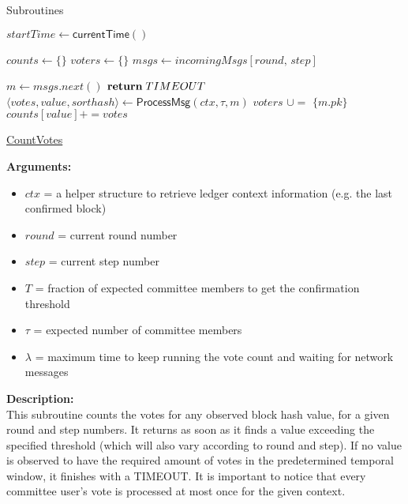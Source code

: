 \documentclass[10pt,a4paper]{article}
\begin{document}
\begin{section}{Subroutines}\label{sect:soubroutines}

\begin{algorithm}[H]
    \begin{algorithmic}[H]

    \State $startTime \gets \mathsf{currentTime}()$

    \State $counts \gets \{\}$ 
    \State $voters \gets \{\}$
    \State $msgs \gets incomingMsgs[round,\,step]$

        \State $m \gets msgs.next()$
                \State $\Return\;TIMEOUT$
            \EndIf
        \Else
            \State $ \langle votes, value, sorthash \rangle \gets \mathsf{ProcessMsg}(ctx, \tau, m)$
            \State $voters$ $\cup=$ $\{m.pk\}$
            \State $counts[value] += votes$
        \EndIf
    \EndWhile
    \EndFunction
    \end{algorithmic}
    \caption{\underline{CountVotes}}
\end{algorithm}


\noindent \textbf{Arguments:}
\begin{itemize}
    \item $ctx$ = a helper structure to retrieve ledger context information (e.g. the last confirmed block)
    \item $round$ = current round number
    \item $step$ = current step number
    \item $T$ = fraction of expected committee members to get the confirmation threshold
    \item $\tau$ = expected number of committee members
    \item $\lambda$ = maximum time to keep running the vote count and waiting for network messages
  \end{itemize}

\noindent \textbf{Description:}\\
This subroutine counts the votes for any observed block hash value, for a given 
round and step numbers.
It returns as soon as it finds a value exceeding the specified threshold (which
will also vary according to round and step).
If no value is observed to have the required amount of votes in the predetermined 
temporal window, it finishes with a TIMEOUT.
It is important to notice that every committee user's vote is processed at most 
once for the given context.\\


\end{section}
\end{document}

